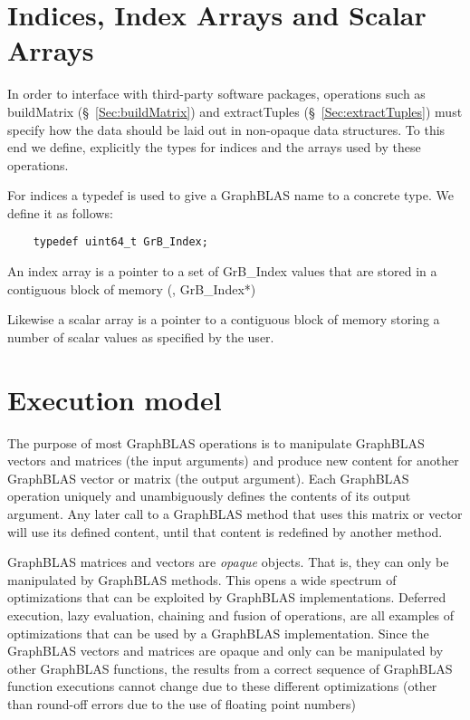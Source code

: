 \section{Indices, Index Arrays and Scalar Arrays}

In order to interface with third-party software packages, operations 
such as buildMatrix (\S~\ref{Sec:buildMatrix})
and extractTuples (\S~\ref{Sec:extractTuples}) must specify how 
the data should be laid out in  non-opaque data structures.  To 
this end we define, explicitly the types for indices and the arrays 
used by these operations.

For indices a typedef is used to give a GraphBLAS name to a concrete type. We define it as follows:

\begin{verbatim}
    typedef uint64_t GrB_Index;
\end{verbatim}

An index array is a pointer to a set of {\sf GrB\_Index} values that are 
stored in a contiguous block of memory (\ie, {\sf GrB\_Index*})

Likewise a scalar array is a pointer to a contiguous block of memory 
storing a number of scalar values as specified by the user.

\section{Execution model}

The purpose of most GraphBLAS operations is to manipulate GraphBLAS 
vectors and matrices (the input arguments) and produce new content for 
another GraphBLAS vector or matrix (the output argument).
Each GraphBLAS operation uniquely and unambiguously defines the 
contents of its output argument.  Any later call to a GraphBLAS method 
that uses this matrix or vector will use its defined content, until
that content is redefined by another method.

GraphBLAS matrices and vectors are \emph{opaque} objects. That is, they 
can only be manipulated by GraphBLAS methods. This opens a wide spectrum 
of optimizations that can be exploited by GraphBLAS implementations.
Deferred execution, lazy evaluation, chaining and fusion of operations, 
are all examples of optimizations that can be used by a GraphBLAS 
implementation. Since the GraphBLAS vectors and matrices are
opaque and only can be manipulated by other GraphBLAS functions, 
the results from a correct sequence of GraphBLAS function executions
cannot change due to these different optimizations (other than 
round-off errors due to the use of floating point numbers) 

